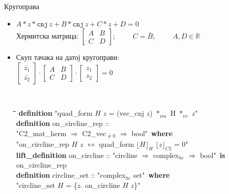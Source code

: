 \documentclass[slidestop, compress, mathserif, containsverbatim, xcolor=dvipsnames]{beamer}
\newcommand{\Repnzv}[1]{\ensuremath{\lfloor#1\rfloor_{C2}}}
\newcommand{\Repcm}[1]{\ensuremath{\lfloor#1\rfloor_{H}}}
\begin{document}
\begin{frame}{Кругоправа}
  \begin{itemize}
  \item $A*z*\mathtt{cnj}\,z + B*\mathtt{cnj}\,z + C*z + D = 0$ \\
        Хермитска матрица: $\begin{bmatrix} A & B \\ C & D\end{bmatrix}$;\ \ \ \ \ $C = \bar{B}$;\ \ \ \ \ $A, D \in \mathbb{R}$ \vfill
  \item Скуп тачака на датој кругоправи: \\
    $\begin{bmatrix} \bar{z_1} \\ \bar{z_2} \end{bmatrix} \cdot \begin{bmatrix} A & B \\ C & D\end{bmatrix} \cdot \begin{bmatrix} z_1 \\ z_2 \end{bmatrix} = 0$
    \begin{footnotesize} {\tt
        \begin{tabbing}
          \hspace{5mm}\=\hspace{5mm}\=\hspace{5mm}\=\hspace{5mm}\=\hspace{5mm}\=\kill
          {\bf definition} "{}quad\_form $H$ $z$ = (vec\_cnj $z$) $*_{vm}$ H $*_{vv}$ $z$"\\
          {\bf definition} on\_circline\_rep :: \\
          \> "{}C2\_mat\_herm $\Rightarrow$ C2\_vec$_{\neq 0}$ $\Rightarrow$ bool"\ {\bf where}\\
          \>"{}on\_circline\_rep $H$ $z$ $\longleftrightarrow$ quad\_form $\Repcm{H}$ $\Repnzv{z}$ = 0"\\
          {\bf lift\_definition} on\_circline :: "{}circline $\Rightarrow$ complex$_{hc}$ $\Rightarrow$ bool"\ {\bf is}\\
          \> on\_circline\_rep\\
          {\bf definition} circline\_set :: "{}complex$_{hc}$ set"\ {\bf where} \\
          \>"{}circline\_set $H$ = \{$z$. on\_circline $H$ $z$\}"
        \end{tabbing}
    } \end{footnotesize}
  \end{itemize}
\end{frame}
\end{document}
